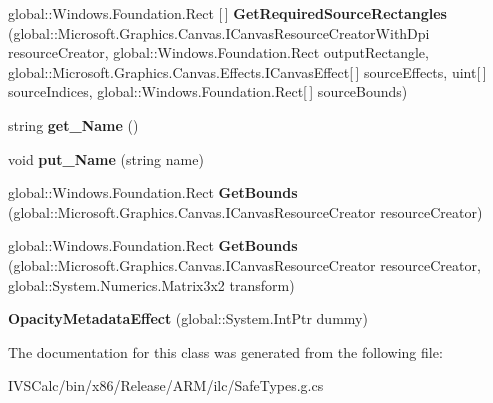\begin{DoxyCompactItemize}
\item 
\mbox{\label{class_microsoft_1_1_graphics_1_1_canvas_1_1_effects_1_1_opacity_metadata_effect_a3ff3ebac71e5a05b6b744e4eefd66671}} 
global\+::\+Windows.\+Foundation.\+Rect \mbox{[}$\,$\mbox{]} {\bfseries Get\+Required\+Source\+Rectangles} (global\+::\+Microsoft.\+Graphics.\+Canvas.\+I\+Canvas\+Resource\+Creator\+With\+Dpi resource\+Creator, global\+::\+Windows.\+Foundation.\+Rect output\+Rectangle, global\+::\+Microsoft.\+Graphics.\+Canvas.\+Effects.\+I\+Canvas\+Effect\mbox{[}$\,$\mbox{]} source\+Effects, uint\mbox{[}$\,$\mbox{]} source\+Indices, global\+::\+Windows.\+Foundation.\+Rect\mbox{[}$\,$\mbox{]} source\+Bounds)
\item 
\mbox{\label{class_microsoft_1_1_graphics_1_1_canvas_1_1_effects_1_1_opacity_metadata_effect_aab5d90826e4fc50039ebb8cf1f34083e}} 
string {\bfseries get\+\_\+\+Name} ()
\item 
\mbox{\label{class_microsoft_1_1_graphics_1_1_canvas_1_1_effects_1_1_opacity_metadata_effect_a6c03432d14b938605ba82f54e22b056b}} 
void {\bfseries put\+\_\+\+Name} (string name)
\item 
\mbox{\label{class_microsoft_1_1_graphics_1_1_canvas_1_1_effects_1_1_opacity_metadata_effect_ab1f9e665b08fba60c7017ccb53f42f8e}} 
global\+::\+Windows.\+Foundation.\+Rect {\bfseries Get\+Bounds} (global\+::\+Microsoft.\+Graphics.\+Canvas.\+I\+Canvas\+Resource\+Creator resource\+Creator)
\item 
\mbox{\label{class_microsoft_1_1_graphics_1_1_canvas_1_1_effects_1_1_opacity_metadata_effect_a89acda99516a18927c0f73e58923e63b}} 
global\+::\+Windows.\+Foundation.\+Rect {\bfseries Get\+Bounds} (global\+::\+Microsoft.\+Graphics.\+Canvas.\+I\+Canvas\+Resource\+Creator resource\+Creator, global\+::\+System.\+Numerics.\+Matrix3x2 transform)
\item 
\mbox{\label{class_microsoft_1_1_graphics_1_1_canvas_1_1_effects_1_1_opacity_metadata_effect_a85531fd6a5579cae342769ff88d8351f}} 
{\bfseries Opacity\+Metadata\+Effect} (global\+::\+System.\+Int\+Ptr dummy)
\end{DoxyCompactItemize}


The documentation for this class was generated from the following file\+:\begin{DoxyCompactItemize}
\item 
I\+V\+S\+Calc/bin/x86/\+Release/\+A\+R\+M/ilc/Safe\+Types.\+g.\+cs\end{DoxyCompactItemize}
